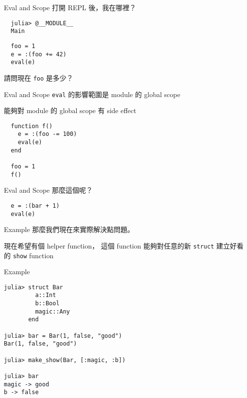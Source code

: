 \documentclass[14pt]{beamer}
\begin{document}
\begin{frame}[fragile]{Eval and Scope}
  打開 REPL 後，我在哪裡？

  \pause

\begin{lstlisting}
  julia> @__MODULE__
  Main
\end{lstlisting}

  \pause

\begin{lstlisting}
  foo = 1
  e = :(foo += 42)
  eval(e)
\end{lstlisting}

  請問現在 \texttt{foo} 是多少？
\end{frame}


\begin{frame}[fragile]{Eval and Scope}
  \texttt{eval} 的影響範圍是 module 的 global scope

  能夠對 module 的 global scope 有 side effect

  \pause

\begin{lstlisting}
  function f()
    e = :(foo -= 100)
    eval(e)
  end

  foo = 1
  f()
\end{lstlisting}
\end{frame}


\begin{frame}[fragile]{Eval and Scope}
  那麼這個呢？

\begin{lstlisting}
  e = :(bar + 1)
  eval(e)
\end{lstlisting}
\end{frame}


\begin{frame}[fragile]{Example}
  那麼我們現在來實際解決點問題。

  \pause

  現在希望有個 helper function，
  這個 function 能夠對任意的新 \texttt{struct} 建立好看的 \texttt{show} function
\end{frame}


\begin{frame}[fragile]{Example}
\begin{lstlisting}
julia> struct Bar
         a::Int
         b::Bool
         magic::Any
       end

julia> bar = Bar(1, false, "good")
Bar(1, false, "good")

julia> make_show(Bar, [:magic, :b])

julia> bar
magic -> good
b -> false
\end{lstlisting}
\end{frame}
\end{document}
